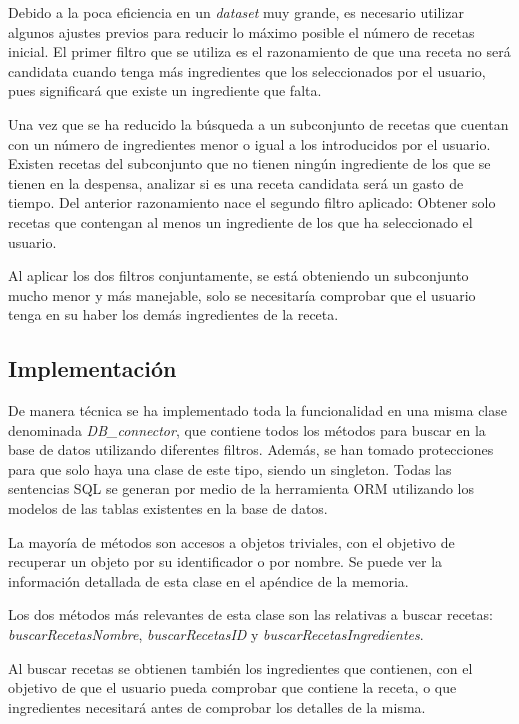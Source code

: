Debido a la poca eficiencia en un \emph{\gls{dataset}} muy grande, es necesario utilizar algunos ajustes previos para reducir lo máximo posible el número de recetas inicial. El primer filtro que se utiliza es el razonamiento de que una receta no será candidata cuando tenga más ingredientes que los seleccionados por el usuario, pues significará que existe un ingrediente que falta. 

Una vez que se ha reducido la búsqueda a un subconjunto de recetas que cuentan con un número de ingredientes menor o igual a los introducidos por el usuario. Existen recetas del subconjunto que no tienen ningún ingrediente de los que se tienen en la despensa, analizar si es una receta candidata será un gasto de tiempo. Del anterior razonamiento nace el segundo filtro aplicado: Obtener solo recetas que contengan al menos un ingrediente de los que ha seleccionado el usuario. 

Al aplicar los dos filtros conjuntamente, se está obteniendo un subconjunto mucho menor y más manejable, solo se necesitaría comprobar que el usuario tenga en su haber los demás ingredientes de la receta.

\subsection{Implementación}
De manera técnica se ha implementado toda la funcionalidad en una misma clase denominada \textit{DB\_connector}, que contiene todos los métodos para buscar en la base de datos utilizando diferentes filtros. Además, se han tomado protecciones para que solo haya una clase de este tipo, siendo un \gls{singleton}. Todas las sentencias \gls{SQL} se generan por medio de la herramienta \gls{ORM} utilizando los modelos de las tablas existentes en la base de datos.

La mayoría de métodos son accesos a objetos triviales, con el objetivo de recuperar un objeto por su identificador o por nombre. Se puede ver la información detallada de esta clase en el apéndice de la memoria.

Los dos métodos más relevantes de esta clase son las relativas a buscar recetas: \textit{buscarRecetasNombre}, \textit{buscarRecetasID} y \textit{buscarRecetasIngredientes}.

Al buscar recetas se obtienen también los ingredientes que contienen, con el objetivo de que el usuario pueda comprobar que contiene la receta, o que ingredientes necesitará antes de comprobar los detalles de la misma.

